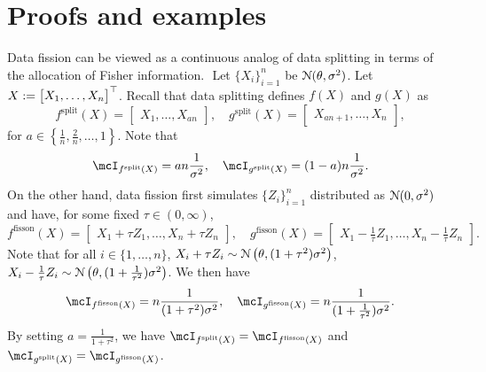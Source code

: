 \section{Proofs and examples}
\bexa
Data fission can be viewed as a continuous analog of data splitting in terms of the allocation of Fisher information.
\newline $ $
Let $\{X_i\}_{i=1}^n$ be \iid $\mathcal{N}(\theta, \sigma^2)$. Let $X := \begin{bmatrix} X_1, \dots, X_n \end{bmatrix}^\top$. Recall that data splitting defines $f(X)$ and $g(X)$ as
\[
f^{\text{split}}(X) = \begin{bmatrix} X_1, \dots, X_{an} \end{bmatrix},\quad
g^{\text{split}}(X) = \begin{bmatrix} X_{an+1}, \dots, X_{n} \end{bmatrix},
\]
for $a\in\left\{\frac{1}{n}, \frac{2}{n}, \dots, 1\right\}$.
Note that
\[
\mcI_{f^{\text{split}}(X)} = an\frac{1}{\sigma^2},\quad
\mcI_{g^{\text{split}}(X)} = (1-a)n\frac{1}{\sigma^2}.
\]
On the other hand, data fission first simulates $\{Z_i\}_{i=1}^n$ distributed as \iid $\mathcal{N}(0, \sigma^2)$ and have, for some fixed $\tau\in(0,\infty)$,
\[
f^{\text{fisson}}(X) = \begin{bmatrix} X_1 + \tau Z_1, \dots, X_n + \tau Z_n \end{bmatrix},\quad
g^{\text{fisson}}(X) = \begin{bmatrix} X_1 - \frac{1}{\tau}Z_1, \dots, X_n - \frac{1}{\tau}Z_n \end{bmatrix}.
\]
Note that for all $i\in\{1,\dots,n\}$, $X_i + \tau Z_i \sim \mathcal{N}\left(\theta, (1+\tau^2)\sigma^2 \right)$, $X_i - \frac{1}{\tau} Z_i \sim \mathcal{N}\left(\theta, (1+\frac{1}{\tau^2})\sigma^2 \right)$. We then have
\[
\mcI_{f^{\text{fisson}}(X)} = n\frac{1}{(1+\tau^2)\sigma^2},\quad
\mcI_{g^{\text{fisson}}(X)} = n\frac{1}{(1+\frac{1}{\tau^2})\sigma^2}.
\]
By setting $a = \frac{1}{1+\tau^2}$, we have $\mcI_{f^{\text{split}}(X)} = \mcI_{f^{\text{fisson}}(X)}$ and $\mcI_{g^{\text{split}}(X)} = \mcI_{g^{\text{fisson}}(X)}$.
\eexa

